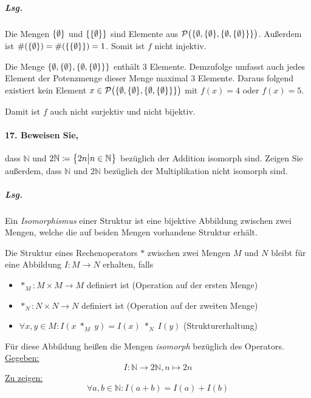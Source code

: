 \documentclass{scrreprt}
\begin{document}
\begin{enumerate}[(a)]
  \subparagraph{Lsg.}
  Die Mengen $\qty{\emptyset}$ und $\qty{\qty{\emptyset}}$ sind Elemente aus
  $\mathcal{P}\qty\big(\qty{\emptyset, \qty{\emptyset}, \qty{\emptyset,
      \qty{\emptyset}}})$.
  Außerdem ist $\#(\qty{\emptyset}) = \#(\qty{\qty{\emptyset}}) = 1$.
  Somit ist $f$ nicht injektiv.

  Die Menge $\qty{\emptyset, \qty{\emptyset}, \qty{\emptyset, \qty{\emptyset}}}$
  enthält $3$ Elemente.
  Demzufolge umfasst auch jedes Element der Potenzmenge dieser Menge maximal $3$
  Elemente.
  Daraus folgend existiert kein Element
  $x \in \mathcal{P}\qty\big(\qty{\emptyset, \qty{\emptyset}, \qty{\emptyset,
      \qty{\emptyset}}})$ mit $f(x) = 4$ oder $f(x) = 5$.

  Damit ist $f$ auch nicht surjektiv und nicht bijektiv.
\end{enumerate}

\newpage
\paragraph{17. Beweisen Sie,} dass $\mathbb{N}$ und
$2\mathbb{N} \coloneqq \qty\big{ 2n {\big |} n \in \mathbb{N}}$ bezüglich der
Addition isomorph sind.
Zeigen Sie außerdem, dass $\mathbb{N}$ und $2\mathbb{N}$ bezüglich der
Multiplikation nicht isomorph sind.

\subparagraph{Lsg.} Ein \emph{Isomorphismus} einer Struktur ist eine
bijektive Abbildung zwischen zwei Mengen, welche die auf beiden Mengen
vorhandene Struktur erhält.

Die Struktur eines Rechenoperators $*$ zwischen zwei Mengen $M$ und $N$
bleibt für eine Abbildung $I \colon M \to N$ erhalten, falls
\begin{itemize}
\item $*_M \colon M \times M \to M$ definiert ist (Operation auf der ersten Menge)
\item $*_N \colon N \times N \to N$ definiert ist (Operation auf der zweiten Menge)
\item $\forall x, y \in M \colon I(x \; *_M \; y) = I(x) \; *_N \; I(y)$ (Strukturerhaltung)
\end{itemize}

Für diese Abbildung heißen die Mengen \emph{isomorph} bezüglich des Operators. \\

\noindent
\underline{Gegeben:}
\[
  I \colon \mathbb{N} \to 2\mathbb{N}, n \mapsto 2n
\]
\underline{Zu zeigen:}
\[
  \forall a, b \in \mathbb{N} \colon I(a + b) = I(a) + I(b)
\]
\end{document}
